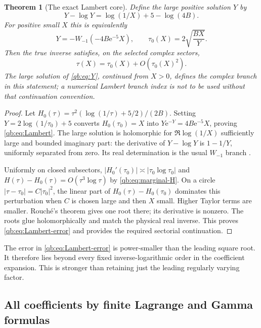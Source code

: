 \documentclass[11pt,a4paper]{article}
\newtheorem{theorem}{Theorem}[section]
\theoremstyle{definition}\newtheorem{definition}[theorem]{Definition}
\theoremstyle{remark}\newtheorem{remark}[theorem]{Remark}
\newcommand{\ee}{\mathrm e}
\numberwithin{equation}{section}
\begin{document}
\begin{theorem}[The exact Lambert core]\label{qb:thm:Lambert}
Define the large positive solution $Y$ by
\begin{equation}\label{qb:eq:Y}
 Y-\log Y=\log(1/X)+5-\log(4B).
\end{equation}
For positive small $X$ this is equivalently
\begin{equation}\label{qb:eq:Lambert}
 Y=-W_{-1}(-4B\ee^{-5}X),\qquad
 \tau_0(X)=2\sqrt{\frac{BX}{Y}}.
\end{equation}
Then the true inverse satisfies, on the selected complex sectors,
\begin{equation}\label{qb:eq:Lambert-error}
 \tau(X)=\tau_0(X)+O(\tau_0(X)^2).
\end{equation}
The large solution of \eqref{qb:eq:Y}, continued from $X>0$, defines the
complex branch in this statement; a numerical Lambert branch index is not
to be used without that continuation convention.
\end{theorem}
\begin{proof}
Let $H_0(\tau)=\tau^2(\log(1/\tau)+5/2)/(2B)$. Setting
$Y=2\log(1/\tau_0)+5$ converts $H_0(\tau_0)=X$ into
$Y\ee^{-Y}=4B\ee^{-5}X$, proving \eqref{qb:eq:Lambert}.
The large solution is holomorphic for $\Re\log(1/X)$ sufficiently large
and bounded imaginary part: the derivative of $Y-\log Y$ is
$1-1/Y$, uniformly separated from zero. Its real determination is the
usual $W_{-1}$ branch \cite{dlmfw}.

Uniformly on closed subsectors,
$|H_0'(\tau_0)|\asymp|\tau_0\log\tau_0|$ and
$H(\tau)-H_0(\tau)=O(\tau^3\log\tau)$ by
\eqref{qb:eq:marginal-H}. On a circle
$|\tau-\tau_0|=C|\tau_0|^2$, the linear part of
$H_0(\tau)-H_0(\tau_0)$ dominates this perturbation when $C$ is chosen
large and then $X$ small. Higher Taylor terms are smaller. Rouch\'e's
theorem gives one root there; its derivative is nonzero. The roots glue
holomorphically and match the physical real inverse. This proves
\eqref{qb:eq:Lambert-error} and provides the required sectorial
continuation.
\end{proof}

The error in \eqref{qb:eq:Lambert-error} is power-smaller than the leading
square root. It therefore lies beyond every fixed inverse-logarithmic
order in the coefficient expansion. This is stronger than retaining just
the leading regularly varying factor.

\subsection{All coefficients by finite Lagrange and Gamma formulas}
\end{document}
